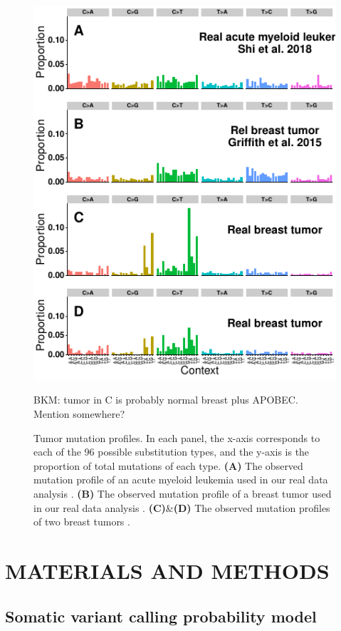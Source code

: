 \documentclass[a4,center,fleqn]{NAR}
\newcommand{\bkmcomment}[1]{{\color{blue}BKM: #1}}
\begin{document}
\begin{figure}
  \begin{center}
  \includegraphics{figures/real_signatures_only.pdf}
  \end{center}
  \bkmcomment{tumor in C is probably normal breast plus APOBEC. Mention somewhere?}
  \caption{Tumor mutation profiles.
  In each panel, the x-axis corresponds to each of the 96 possible substitution types, and the y-axis is the proportion of total mutations of each type.
  \textbf{(A)} The observed mutation profile of an acute myeloid leukemia used in our real data analysis \cite{Griffith2015}.
  \textbf{(B)} The observed mutation profile of a breast tumor used in our real data analysis \cite{Shi2018}.
  \textbf{(C)}\&\textbf{(D)} The observed mutation profiles of two breast tumors \cite{Alexandrov2019}.
   }
  \label{NAR-realsigfig}
 \end{figure}

\section{MATERIALS AND METHODS}
\subsection{Somatic variant calling probability model}
\end{document}
